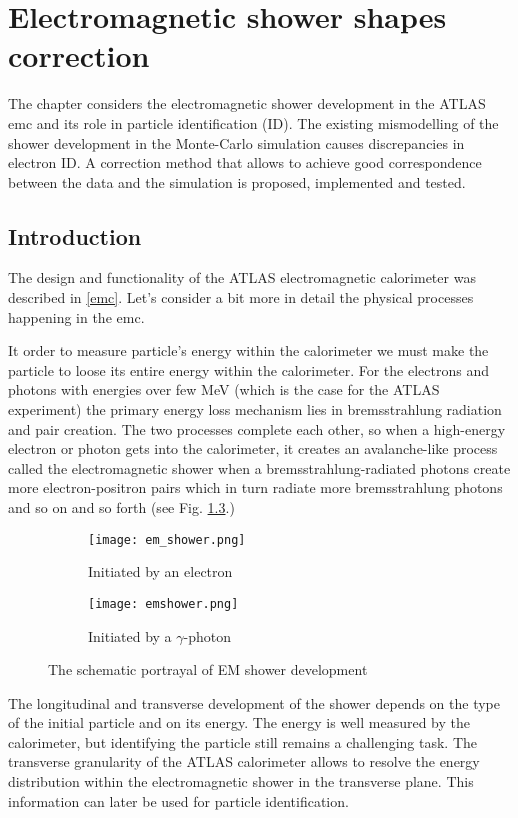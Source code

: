 \chapter{Electromagnetic shower shapes correction }
	\label{ch::sshapes}
	The chapter considers the electromagnetic shower development in the ATLAS \gls{emc} and its role in particle identification (ID). The existing mismodelling of the shower development in the Monte-Carlo simulation causes discrepancies in electron ID. A correction method that allows to achieve good correspondence between the data and the simulation is proposed, implemented and tested.
  \section{Introduction}
  The design and functionality of the ATLAS electromagnetic calorimeter was described in \ref{emc}. Let's consider a bit more in detail the physical processes happening in the \gls{emc}. 
  
  It order to measure particle's energy within the calorimeter we must make the particle to loose its entire energy within the calorimeter. For the electrons and photons with energies over few MeV (which is the case for the ATLAS experiment) the primary energy loss mechanism lies in bremsstrahlung radiation and pair creation. The two processes complete each other, so when a high-energy electron or photon gets into the calorimeter, it creates an avalanche-like process called the electromagnetic shower when a bremsstrahlung-radiated photons create more electron-positron pairs which in turn radiate more bremsstrahlung photons and so on and so forth (see Fig. \ref{fig::em_shower}.)\\
  	\begin{figure}[htbp]
  	\begin{subfigure}[t]{0.5\textwidth}
  		\texttt{[image: em\_shower.png]}
  		\caption[Started by an electron]{Initiated by an electron}
  		\label{fig::id}
  	\end{subfigure}
  	\hfill
  	\begin{subfigure}[t]{0.5\textwidth} 
  		\texttt{[image: emshower.png]}
  		\caption[Started by a $\gamma$-photon]{Initiated by a $\gamma$-photon}
  		\label{fig::pd}
  	\end{subfigure}
  	\caption{The schematic portrayal of EM shower development}
  	\label{fig::em_shower}
  \end{figure}
    The longitudinal and transverse development of the shower depends on the type of the initial particle and on its energy. The energy is well measured by the calorimeter, but identifying the particle still remains a challenging task. The transverse granularity of the ATLAS calorimeter allows to resolve the energy distribution within the electromagnetic shower in the transverse plane. This information can later be used for particle identification.
    
